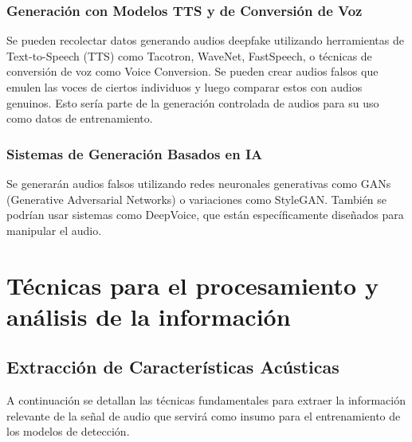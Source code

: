\subsubsection{Generación con Modelos TTS y de Conversión de Voz}

Se pueden recolectar datos generando audios deepfake utilizando herramientas de Text-to-Speech (TTS) como Tacotron, WaveNet, FastSpeech, o técnicas de conversión de voz como Voice Conversion. Se pueden crear audios falsos que emulen las voces de ciertos individuos y luego comparar estos con audios genuinos. Esto sería parte de la generación controlada de audios para su uso como datos de entrenamiento.

\subsubsection{Sistemas de Generación Basados en IA}

Se generarán audios falsos utilizando redes neuronales generativas como GANs (Generative Adversarial Networks) o variaciones como StyleGAN. También se podrían usar sistemas como DeepVoice, que están específicamente diseñados para manipular el audio.

\section{Técnicas para el procesamiento y análisis de la información}

\subsection{Extracción de Características Acústicas}
A continuación se detallan las técnicas fundamentales para extraer la información relevante de la señal de audio que servirá como insumo para el entrenamiento de los modelos de detección.

